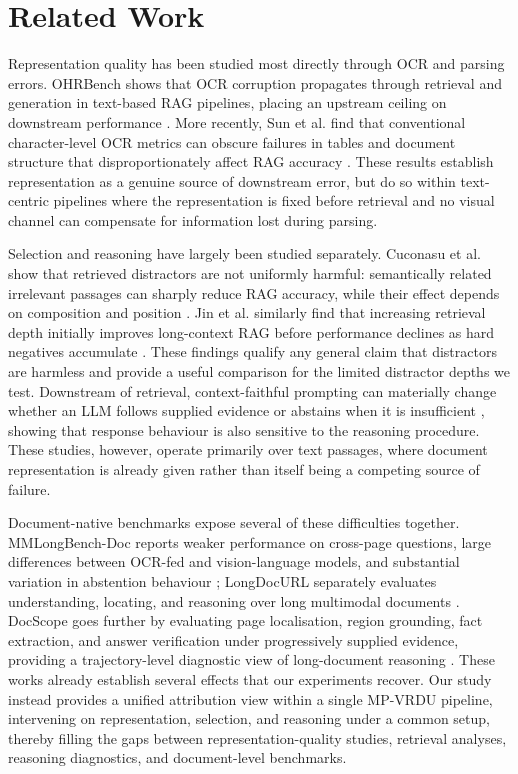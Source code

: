 \section{Related Work}
\label{sec:related_work}
Representation quality has been studied most directly through OCR and parsing errors. OHRBench shows that OCR corruption propagates through retrieval and generation in text-based RAG pipelines, placing an upstream ceiling on downstream performance \citep{zhang2025ocr}. More recently, Sun et al. find that conventional character-level OCR metrics can obscure failures in tables and document structure that disproportionately affect RAG accuracy \citep{sun2026when}. These results establish representation as a genuine source of downstream error, but do so within text-centric pipelines where the representation is fixed before retrieval and no visual channel can compensate for information lost during parsing.

Selection and reasoning have largely been studied separately. Cuconasu et al. show that retrieved distractors are not uniformly harmful: semantically related irrelevant passages can sharply reduce RAG accuracy, while their effect depends on composition and position \citep{cuconasu2024power}. Jin et al. similarly find that increasing retrieval depth initially improves long-context RAG before performance declines as hard negatives accumulate \citep{jin2025long}. These findings qualify any general claim that distractors are harmless and provide a useful comparison for the limited distractor depths we test. Downstream of retrieval, context-faithful prompting can materially change whether an LLM follows supplied evidence or abstains when it is insufficient \citep{zhou2023context}, showing that response behaviour is also sensitive to the reasoning procedure. These studies, however, operate primarily over text passages, where document representation is already given rather than itself being a competing source of failure.

Document-native benchmarks expose several of these difficulties together. MMLongBench-Doc reports weaker performance on cross-page questions, large differences between OCR-fed and vision-language models, and substantial variation in abstention behaviour \citep{ma2024mmlongbench}; LongDocURL separately evaluates understanding, locating, and reasoning over long multimodal documents \citep{deng2025longdocurl}. DocScope goes further by evaluating page localisation, region grounding, fact extraction, and answer verification under progressively supplied evidence, providing a trajectory-level diagnostic view of long-document reasoning \citep{feng2026docscope}. These works already establish several effects that our experiments recover. Our study instead provides a unified attribution view within a single MP-VRDU pipeline, intervening on representation, selection, and reasoning under a common setup, thereby filling the gaps between representation-quality studies, retrieval analyses, reasoning diagnostics, and document-level benchmarks.

